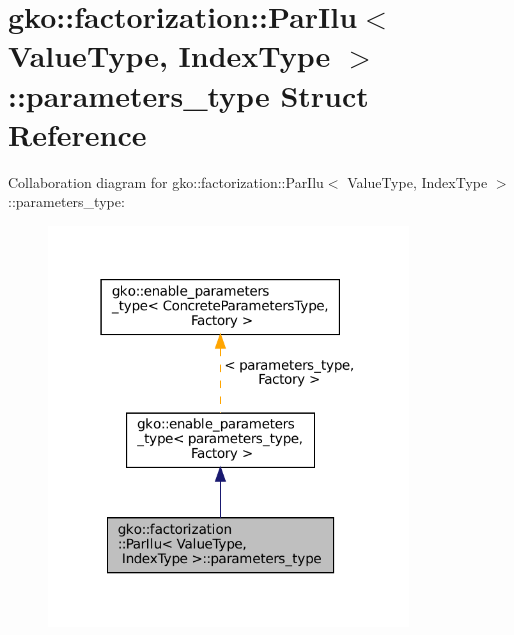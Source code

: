 \hypertarget{structgko_1_1factorization_1_1ParIlu_1_1parameters__type}{}\section{gko\+:\+:factorization\+:\+:Par\+Ilu$<$ Value\+Type, Index\+Type $>$\+:\+:parameters\+\_\+type Struct Reference}
\label{structgko_1_1factorization_1_1ParIlu_1_1parameters__type}


Collaboration diagram for gko\+:\+:factorization\+:\+:Par\+Ilu$<$ Value\+Type, Index\+Type $>$\+:\+:parameters\+\_\+type\+:
\nopagebreak
\begin{figure}[H]
\begin{center}
\leavevmode
\includegraphics[width=271pt]{structgko_1_1factorization_1_1ParIlu_1_1parameters__type__coll__graph}
\end{center}
\end{figure}
